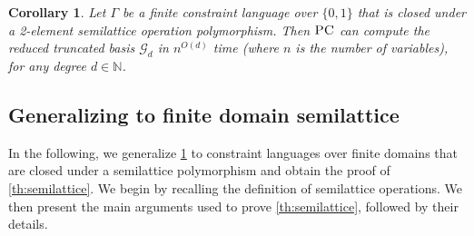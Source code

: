 \documentclass[11pt]{article}
\newcommand{\PC}{\textsc{PC}}
\newcommand{\1}{\textbf{1}}
\newcommand{\GB}{\text{Gr\"{o}bner} }
\newtheorem{corollary}[theorem]{Corollary}
\begin{document}
\begin{corollary}\label{th:2semilattice}
    Let $\Gamma$ be a finite constraint language over $\{0, 1\}$ that is closed under  a 2-element semilattice operation polymorphism. Then $\PC$ can compute the reduced truncated \GB basis $\mathcal{G}_d$ in $n^{O(d)}$ time (where $n$ is the number of variables), for any degree $d\in \mathbb{N}$.
\end{corollary}



\subsection{Generalizing to finite domain semilattice}
In the following, we generalize \cref{th:2semilattice} to constraint languages over finite domains that are closed under a semilattice polymorphism and obtain the proof of \cref{th:semilattice}. We begin by recalling the definition of semilattice operations. We then present the main arguments used to prove \cref{th:semilattice}, followed by their details.
\end{document}
